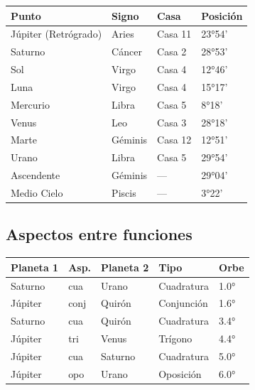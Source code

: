 \documentclass[11pt,a4paper]{article}
\begin{document}
\begin{center}
\begin{tabular}{llll}
\toprule
\textbf{Punto} & \textbf{Signo} & \textbf{Casa} & \textbf{Posición} \\
\midrule

Júpiter (Retrógrado) &
Aries &
Casa 11 &
23°54' \\

Saturno &
Cáncer &
Casa 2 &
28°53' \\

Sol &
Virgo &
Casa 4 &
12°46' \\

Luna &
Virgo &
Casa 4 &
15°17' \\

Mercurio &
Libra &
Casa 5 &
8°18' \\

Venus &
Leo &
Casa 3 &
28°18' \\

Marte &
Géminis &
Casa 12 &
12°51' \\

Urano &
Libra &
Casa 5 &
29°54' \\

Ascendente &
Géminis &
--- &
29°04' \\

Medio Cielo &
Piscis &
--- &
3°22' \\

\bottomrule
\end{tabular}
\end{center}

\vspace{0.8cm}

\subsection*{Aspectos entre funciones}

\begin{center}
\begin{tabular}{lllll}
  \toprule
  \textbf{Planeta 1} & \textbf{Asp.} & \textbf{Planeta 2} & \textbf{Tipo} & \textbf{Orbe} \\
  \midrule
  Saturno & cua & Urano & Cuadratura & 1.0° \\
  Júpiter & conj & Quirón & Conjunción & 1.6° \\
  Saturno & cua & Quirón & Cuadratura & 3.4° \\
  Júpiter & tri & Venus & Trígono & 4.4° \\
  Júpiter & cua & Saturno & Cuadratura & 5.0° \\
  Júpiter & opo & Urano & Oposición & 6.0° \\
  \bottomrule
\end{tabular}
\end{center}
\end{document}
